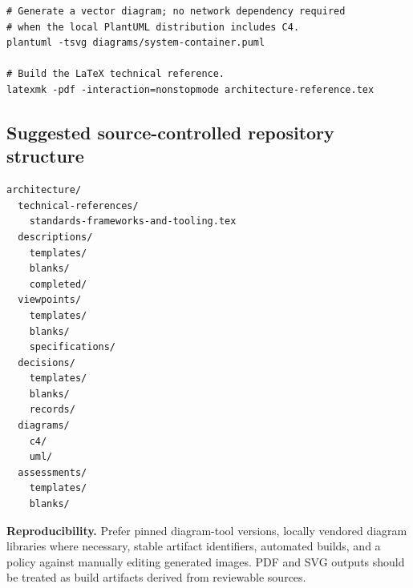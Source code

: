 \documentclass[11pt,letterpaper,oneside]{article}
\begin{document}
\begin{lstlisting}[style=archcode,language={},caption={Illustrative local build commands}]
# Generate a vector diagram; no network dependency required
# when the local PlantUML distribution includes C4.
plantuml -tsvg diagrams/system-container.puml

# Build the LaTeX technical reference.
latexmk -pdf -interaction=nonstopmode architecture-reference.tex
\end{lstlisting}

\subsection{Suggested source-controlled repository structure}
\begin{lstlisting}[style=archcode,language={},caption={Illustrative artifact taxonomy, not a required standard layout}]
architecture/
  technical-references/
    standards-frameworks-and-tooling.tex
  descriptions/
    templates/
    blanks/
    completed/
  viewpoints/
    templates/
    blanks/
    specifications/
  decisions/
    templates/
    blanks/
    records/
  diagrams/
    c4/
    uml/
  assessments/
    templates/
    blanks/
\end{lstlisting}
\begin{notebox}
\textbf{Reproducibility.} Prefer pinned diagram-tool versions, locally vendored diagram libraries where necessary, stable artifact identifiers, automated builds, and a policy against manually editing generated images. PDF and SVG outputs should be treated as build artifacts derived from reviewable sources.
\end{notebox}
\end{document}
